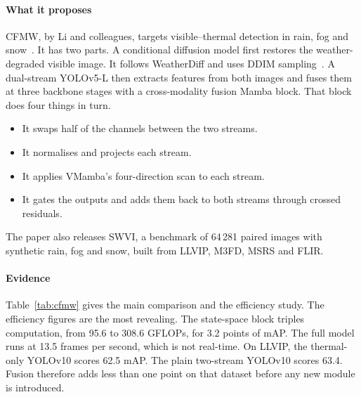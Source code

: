 \paragraph{What it proposes}
CFMW, by Li and colleagues, targets visible--thermal detection in rain, fog
and snow~\citep{li2025cfmw}. It has two parts. A conditional diffusion model
first restores the weather-degraded visible image. It follows WeatherDiff and
uses DDIM sampling~\citep{ozdenizci2023weatherdiff,ho2020ddpm,song2021ddim}.
A dual-stream YOLOv5-L then extracts features from both images and fuses
them at three backbone stages with a cross-modality fusion Mamba block. That
block does four things in turn.
\begin{itemize}
  \item It swaps half of the channels between the two streams.
  \item It normalises and projects each stream.
  \item It applies VMamba's four-direction scan to each stream.
  \item It gates the outputs and adds them back to both streams through
        crossed residuals.
\end{itemize}
The paper also releases SWVI, a benchmark of 64\,281 paired images with
synthetic rain, fog and snow, built from LLVIP, M3FD, MSRS and FLIR.

\paragraph{Evidence}
Table~\ref{tab:cfmw} gives the main comparison and the efficiency study. The
efficiency figures are the most revealing. The state-space block triples
computation, from 95.6 to 308.6 GFLOPs, for 3.2 points of mAP. The full
model runs at 13.5 frames per second, which is not real-time. On LLVIP, the
thermal-only YOLOv10 scores 62.5 mAP. The plain two-stream YOLOv10 scores
63.4. Fusion therefore adds less than one point on that dataset before any
new module is introduced.

